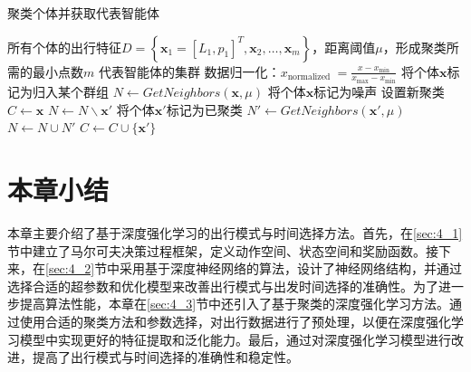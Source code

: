 \begin{algorithm} [H]
\small
\caption{聚类个体并获取代表智能体}\label{DBSCAN}
\begin{algorithmic}
\Require   所有个体的出行特征$D=\left\{\bm{x}_{1}=[L_{1}, p_{1}]^T, \bm{x}_{2}, \ldots, \bm{x}_{m}\right\}$，距离阈值$\mu$，形成聚类所需的最小点数$m$
\Ensure 代表智能体的集群
\State 数据归一化：$x_{\text {normalized }}=\frac{x-x_{\min }}{x_{\max }-x_{\min }}$
    \State 将个体$\bm{x}$标记为归入某个群组
    \State $N \leftarrow GetNeighbors(\bm{x},\mu)$
        \State 将个体$\bm{x}$标记为噪声
    \Else
        \State 设置新聚类$C \leftarrow {\bm{x}}$
            \State $N \leftarrow N \backslash \bm{x'}$
                \State 将个体$\bm{x'}$标记为已聚类
                \State $N' \leftarrow GetNeighbors(\bm{x'},\mu)$
                    \State $N \leftarrow N \cup N'$
                \EndIf
                    \State $C \leftarrow C \cup \{ \bm{x'} \}$
                \EndIf
            \EndIf
        \EndFor
    \EndIf
\EndFor
\end{algorithmic}
\end{algorithm}

\section{本章小结}

本章主要介绍了基于深度强化学习的出行模式与时间选择方法。首先，在\ref{sec:4_1}节中建立了马尔可夫决策过程框架，定义动作空间、状态空间和奖励函数。接下来，在\ref{sec:4_2}节中采用基于深度神经网络的算法，设计了神经网络结构，并通过选择合适的超参数和优化模型来改善出行模式与出发时间选择的准确性。为了进一步提高算法性能，本章在\ref{sec:4_3}节中还引入了基于聚类的深度强化学习方法。通过使用合适的聚类方法和参数选择，对出行数据进行了预处理，以便在深度强化学习模型中实现更好的特征提取和泛化能力。最后，通过对深度强化学习模型进行改进，提高了出行模式与时间选择的准确性和稳定性。
